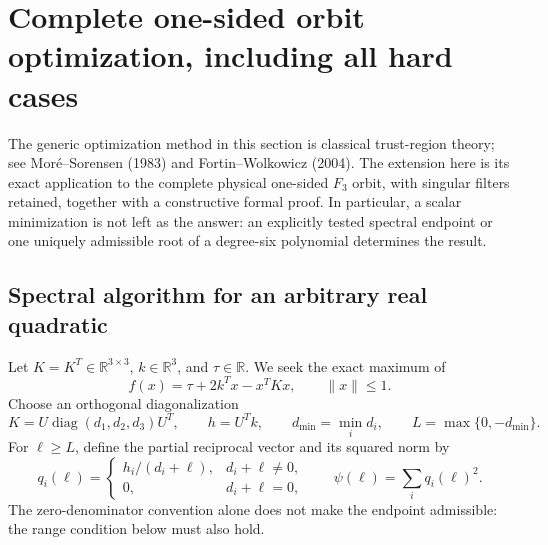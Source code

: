 \section{Complete one-sided orbit optimization, including all hard cases}
\label{sec:complete-trust-region}

The generic optimization method in this section is classical trust-region
theory; see Mor\'e--Sorensen (1983) and Fortin--Wolkowicz (2004).  The extension
here is its exact application to the complete physical one-sided $F_3$ orbit,
with singular filters retained, together with a constructive formal proof.
In particular, a scalar minimization is not left as the answer: an explicitly
tested spectral endpoint or one uniquely admissible root of a degree-six
polynomial determines the result.

\subsection{Spectral algorithm for an arbitrary real quadratic}

Let $K=K^T\in\mathbb R^{3\times3}$, $k\in\mathbb R^3$, and $\tau\in\mathbb R$.
We seek the exact maximum of
\begin{equation}
 f(x)=\tau+2k^Tx-x^TKx,\qquad \|x\|\leq1.
 \label{eq:full-orbit-quadratic}
\end{equation}
Choose an orthogonal diagonalization
\[
 K=U\operatorname{diag}(d_1,d_2,d_3)U^T,\qquad h=U^Tk,
 \qquad d_{\min}=\min_i d_i,
 \qquad L=\max\{0,-d_{\min}\}.
\]
For $\ell\geq L$, define the partial reciprocal vector and its squared norm by
\[
 q_i(\ell)=
 \begin{cases}h_i/(d_i+\ell),&d_i+\ell\ne0,\\0,&d_i+\ell=0,\end{cases}
 \qquad \psi(\ell)=\sum_i q_i(\ell)^2.
\]
The zero-denominator convention alone does not make the endpoint admissible:
the range condition below must also hold.

